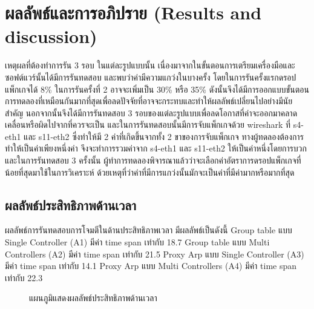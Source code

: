 \section{ผลลัพธ์และการอภิปราย (Results and discussion)}
\indent\indent
เหตุผลที่ต้องทำการรัน 3 รอบ ในแต่ละรูปแบบนั้น เนื่องมาจากในขั้นตอนการเตรียมเครื่องมือและซอฟต์แวร์นั้นได้มีการรันทดสอบ และพบว่าค่ามีความแกว่งในบางครั้ง โดยในการรันครั้งแรกดรอปแพ็กเกจได้ 8\% ในการรันครั้งที่ 2 อาจจะเพิ่มเป็น 30\% หรือ 35\% 
ดังนั้นจึงได้มีการออกแบบขั้นตอนการทดลองที่เหมือนกันมากที่สุดเพื่อลดปัจจัยที่อาจจะกระทบและทำให้ผลลัพธ์เปลี่ยนไปอย่างมีนัยสำคัญ นอกจากนั้นจึงได้มีการรันทดสอบ 3 รอบของแต่ละรูปแบบเพื่อลดโอกาสที่ค่าจะออกมาคลาดเคลื่อนหรือผิดไปจากที่ควรจะเป็น 
และในการรันทดสอบนั้นมีการจับแพ็กเกจด้วย wireshark ที่ s4-eth1 และ s11-eth2 ซึ่งทำให้มี 2 ค่าที่เกิดขึ้นจากทั้ง 2 ขาของการจับแพ็กเกจ ทางผู้ทดลองต้องการทำให้เป็นค่าเพียงหนึ่งค่า
จึงจะทำการรวมค่าจาก s4-eth1 และ s11-eth2 ให้เป็นค่าหนึ่งโดยการบวก และในการรันทดสอบ 3 ครั้งนั้น 
ผู้ทำการทดลองพิจารณาแล้วว่าจะเลือกค่าอัตราการดรอปแพ็กเกจที่น้อยที่สุดมาใช้ในการวิเคราะห์ ด้วยเหตุที่ว่าค่าที่มีการแกว่งนั้นมักจะเป็นค่าที่มีค่ามากหรือมากที่สุด
\\
\subsection{ผลลัพธ์ประสิทธิภาพด้านเวลา}
\indent\indent
ผลลัพธ์การรันทดสอบการโจมตีในด้านประสิทธิภาพเวลา มีผลลัพธ์เป็นดังนี้ 
Group table แบบ Single Controller (A1) มีค่า time span เท่ากับ 18.7
Group table แบบ Multi Controllers (A2) มีค่า time span เท่ากับ 21.5
Proxy Arp แบบ Single Controller (A3) มีค่า time span เท่ากับ 14.1
Proxy Arp แบบ Multi Controllers (A4) มีค่า time span เท่ากับ 22.3

\begin{figure}[h]
    \centering
    \caption{แผนภูมิแสดงผลลัพธ์ประสิทธิภาพด้านเวลา}
\end{figure}
